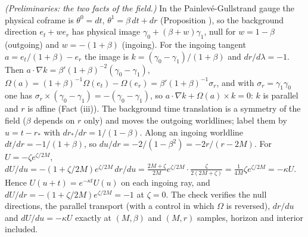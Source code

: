 \emph{(Preliminaries: the two facts of the field.)} In the Painlev\'e-Gullstrand gauge the physical coframe is $\theta^{0} = dt$, $\theta^{1} = \beta\,dt + dr$ (Proposition ), so the background direction $e_{t} + w e_{r}$ has physical image $\gamma_{0} + (\beta + w)\gamma_{1}$, null for $w = 1 - \beta$ (outgoing) and $w = -(1 + \beta)$ (ingoing). For the ingoing tangent $a = e_{t}/(1 + \beta) - e_{r}$ the image is $k = (\gamma_{0} - \gamma_{1})/(1 + \beta)$ and $dr/d\lambda = -1$. Then $a\cdot\nabla k = \beta'(1 + \beta)^{-2}(\gamma_{0} - \gamma_{1})$, $\Omega(a) = (1+\beta)^{-1}\Omega(e_{t}) - \Omega(e_{r}) = \beta'(1 + \beta)^{-1}\sigma_{r}$, and with $\sigma_{r} = \gamma_{1}\gamma_{0}$ one has $\sigma_{r}\times(\gamma_{0} - \gamma_{1}) = -(\gamma_{0} - \gamma_{1})$, so $a\cdot\nabla k + \Omega(a)\times k = 0$: $k$ is parallel and $r$ is affine (Fact (iii)). The background time translation is a symmetry of the field ($\beta$ depends on $r$ only) and moves the outgoing worldlines; label them by $u = t - r_{*}$ with $dr_{*}/dr = 1/(1 - \beta)$. Along an ingoing worldline $dt/dr = -1/(1 + \beta)$, so $du/dr = -2/(1 - \beta^{2}) = -2r/(r - 2M)$. For $U = -\zeta e^{\zeta/2M}$, $dU/du = -(1 + \zeta/2M)e^{\zeta/2M}\,dr/du = \tfrac{2M + \zeta}{2M}e^{\zeta/2M}\cdot\tfrac{\zeta}{2(2M + \zeta)} = \tfrac{1}{4M}\zeta e^{\zeta/2M} = -\kappa U$. Hence $U(u + t) = e^{-\kappa t}U(u)$ on each ingoing ray, and $dU/dr = -(1 + \zeta/2M)e^{\zeta/2M} = -1$ at $\zeta = 0$. The check verifies the null directions, the parallel transport (with a control in which $\Omega$ is reversed), $dr/du$ and $dU/du = -\kappa U$ exactly at $(M, \beta)$ and $(M, r)$ samples, horizon and interior included.

